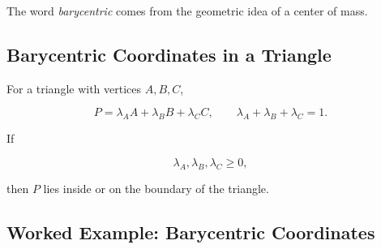 The word \emph{barycentric} comes from the geometric idea of a center of
mass.

\subsection{Barycentric Coordinates in a Triangle}
\label{subsec:barycentric-triangle}

For a triangle with vertices \(A,B,C\),

\[
\boxed{
P=\lambda_AA+\lambda_BB+\lambda_CC,
\qquad
\lambda_A+\lambda_B+\lambda_C=1.
}
\]

If

\[
\lambda_A,\lambda_B,\lambda_C\geq0,
\]

then \(P\) lies inside or on the boundary of the triangle.

\begin{centereddiagram}
\end{centereddiagram}

\subsection{Worked Example: Barycentric Coordinates}
\label{subsec:worked-barycentric-coordinates}

